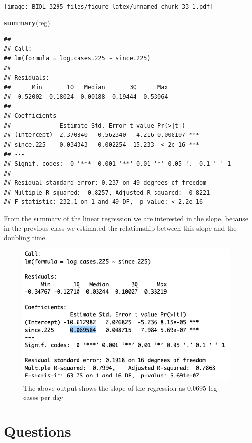 \documentclass[]{book}
\newenvironment{Shaded}{\begin{snugshade}}{\end{snugshade}}
\newcommand{\KeywordTok}[1]{\textcolor[rgb]{0.13,0.29,0.53}{\textbf{{#1}}}}
\newcommand{\NormalTok}[1]{{#1}}
\begin{document}
\texttt{[image: BIOL-3295\_files/figure-latex/unnamed-chunk-33-1.pdf]}

\begin{Shaded}
\begin{Highlighting}[]
\KeywordTok{summary}\NormalTok{(reg)}
\end{Highlighting}
\end{Shaded}

\begin{verbatim}
## 
## Call:
## lm(formula = log.cases.225 ~ since.225)
## 
## Residuals:
##      Min       1Q   Median       3Q      Max 
## -0.52002 -0.18024  0.00188  0.19444  0.53064 
## 
## Coefficients:
##              Estimate Std. Error t value Pr(>|t|)    
## (Intercept) -2.370840   0.562340  -4.216 0.000107 ***
## since.225    0.034343   0.002254  15.233  < 2e-16 ***
## ---
## Signif. codes:  0 '***' 0.001 '**' 0.01 '*' 0.05 '.' 0.1 ' ' 1
## 
## Residual standard error: 0.237 on 49 degrees of freedom
## Multiple R-squared:  0.8257, Adjusted R-squared:  0.8221 
## F-statistic: 232.1 on 1 and 49 DF,  p-value: < 2.2e-16
\end{verbatim}

From the summary of the linear regression we are interested in the
slope, because in the previous class we estimated the relationship
between this slope and the doubling time.

\begin{figure}
\includegraphics[width=0.95\linewidth]{figures/regression} \caption{The above output shows the slope of the regression as 0.0695 log cases per day}\label{fig:regression}
\end{figure}

\section{Questions}\label{questions}
\end{document}
